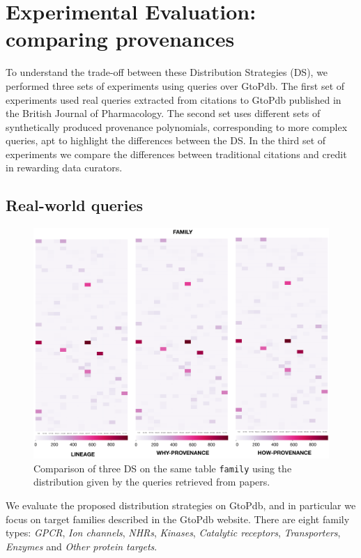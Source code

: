 \section{Experimental Evaluation: comparing provenances}
\label{sec:experiments}
To understand the trade-off between these Distribution Strategies (DS), we performed three sets of experiments using queries over GtoPdb.  The first set of experiments used real queries extracted from citations to GtoPdb published in the British Journal of Pharmacology.  
The second set uses different sets of synthetically produced provenance polynomials, corresponding to more complex queries, apt to highlight the differences between the DS.
In the third set of experiments we compare the differences between traditional citations and credit in rewarding data curators. 

\subsection{Real-world queries}
\label{sec:real_world_queries}

\begin{figure}[t]
  \includegraphics[width=1\textwidth]{figures/paper_based}
  \caption{Comparison of three DS on the same table \texttt{family} using the distribution given by the queries retrieved from papers.}
  \label{figure:comparison_on_papers}
\end{figure}


We evaluate the proposed distribution strategies on GtoPdb, and in particular we focus on target families described in the GtoPdb website. 
There are eight family types: \emph{GPCR}, \emph{Ion channels}, \emph{NHRs}, \emph{Kinases}, \emph{Catalytic receptors}, \emph{Transporters}, \emph{Enzymes} and \emph{Other protein targets}.  

